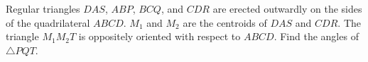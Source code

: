 Regular triangles $DAS$, $ABP$, $BCQ$, and $CDR$ are erected outwardly on the sides of the quadrilateral $ABCD$. $M_1$ and $M_2$ are the centroids of $DAS$ and $CDR$. The triangle $M_1M_2T$ is oppositely oriented with respect to $ABCD$. Find the angles of $\triangle PQT$.

